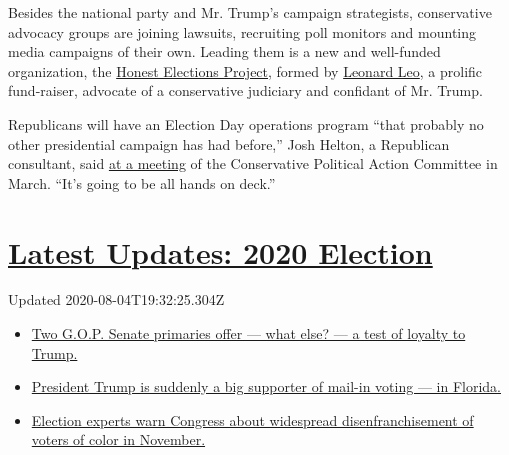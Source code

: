 Besides the national party and Mr. Trump's campaign strategists,
conservative advocacy groups are joining lawsuits, recruiting poll
monitors and mounting media campaigns of their own. Leading them is a
new and well-funded organization, the
\href{https://www.honestelections.org/}{Honest Elections Project},
formed by
\href{https://www.washingtonpost.com/graphics/2019/investigations/leonard-leo-federalists-society-courts/}{Leonard
Leo}, a prolific fund-raiser, advocate of a conservative judiciary and
confidant of Mr. Trump.

Republicans will have an Election Day operations program ``that probably
no other presidential campaign has had before,'' Josh Helton, a
Republican consultant, said
\href{https://cpac.conservative.org/protecting-the-ballot-box-defeating-the-lefts-voter-fraud-machine/}{at
a meeting} of the Conservative Political Action Committee in March.
``It's going to be all hands on deck.''

\hypertarget{latest-updates-2020-election}{%
\section{\texorpdfstring{\href{https://www.nytimes3xbfgragh.onion/2020/08/04/us/elections/primary-election-michigan-arizona-kansas.html?action=click\&pgtype=Article\&state=default\&region=MAIN_CONTENT_1\&context=storylines_live_updates}{Latest
Updates: 2020
Election}}{Latest Updates: 2020 Election}}\label{latest-updates-2020-election}}

Updated 2020-08-04T19:32:25.304Z

\begin{itemize}
\tightlist
\item
  \href{https://www.nytimes3xbfgragh.onion/2020/08/04/us/elections/primary-election-michigan-arizona-kansas.html?action=click\&pgtype=Article\&state=default\&region=MAIN_CONTENT_1\&context=storylines_live_updates\#link-3924dd44}{Two
  G.O.P. Senate primaries offer --- what else? --- a test of loyalty to
  Trump.}
\item
  \href{https://www.nytimes3xbfgragh.onion/2020/08/04/us/elections/primary-election-michigan-arizona-kansas.html?action=click\&pgtype=Article\&state=default\&region=MAIN_CONTENT_1\&context=storylines_live_updates\#link-32b39e33}{President
  Trump is suddenly a big supporter of mail-in voting --- in Florida.}
\item
  \href{https://www.nytimes3xbfgragh.onion/2020/08/04/us/elections/primary-election-michigan-arizona-kansas.html?action=click\&pgtype=Article\&state=default\&region=MAIN_CONTENT_1\&context=storylines_live_updates\#link-6d019753}{Election
  experts warn Congress about widespread disenfranchisement of voters of
  color in November.}
\end{itemize}

